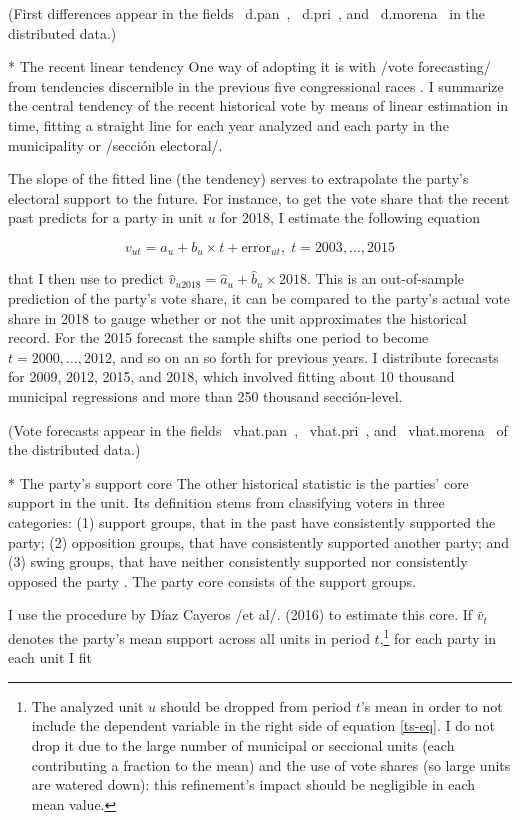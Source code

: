 \documentclass[letter,12pt]{article}
\begin{document}
(First differences appear in the fields ~d.pan~, ~d.pri~, and ~d.morena~ in the distributed data.)

* The recent linear tendency
One way of adopting it is with /vote forecasting/ from tendencies discernible in the previous five congressional races \citep{magar.gubCoatMx.2012}. I summarize the central tendency of the recent historical vote by means of linear estimation in time, fitting a straight line for each year analyzed and each party in the municipality or /sección electoral/. 

The slope of the fitted line (the tendency) serves to extrapolate the party's electoral support to the future. For instance, to get the vote share that the recent past predicts for a party in unit $u$ for 2018, I estimate the following equation 

\begin{equation}
v_{ut} = a_u + b_u \times t + \text{error}_{ut}, \; t = 2003, \ldots, 2015
\end{equation}\label{ts-eq}

that I then use to predict $\hat{v}_{u2018} = \hat{a}_u + \hat{b}_u \times 2018$. This is an out-of-sample prediction of the party's vote share, it can be compared to the party's actual vote share in 2018 to gauge whether or not the unit approximates the historical record. For the 2015 forecast the sample shifts one period to become $t = 2000, \ldots, 2012$, and so on an so forth for previous years. I distribute forecasts for 2009, 2012, 2015, and 2018, which involved fitting about 10 thousand municipal regressions and more than 250 thousand sección-level.

(Vote forecasts appear in the fields ~vhat.pan~, ~vhat.pri~, and ~vhat.morena~ of the distributed data.)

* The party's support core
The other historical statistic is the parties' core support in the unit. Its definition stems from classifying voters in three categories: (1) support groups, that in the past have consistently supported the party; (2) opposition groups, that have consistently supported another party; and (3) swing groups, that have neither consistently supported nor consistently opposed the party \citep{cox.mccubbins.1986}. The party core consists of the support groups. 

I use the procedure by Díaz Cayeros /et al/. (2016) to estimate this core. If $\bar{v}_t$ denotes the party's mean support across all units in period $t$,\footnote{The analyzed unit $u$ should be dropped from period $t$'s mean in order to not include the dependent variable in the right side of equation \ref{ts-eq}. I do not drop it due to the large number of municipal or seccional units (each contributing a fraction to the mean) and the use of vote shares (so large units are watered down): this refinement's impact should be negligible in each mean value.} for each party in each unit I fit
\end{document}
